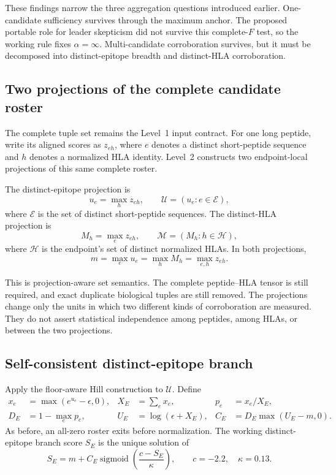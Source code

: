 \documentclass[11pt]{article}
\newcommand{\sigmoid}{\operatorname{sigmoid}}
\begin{document}
These findings narrow the three aggregation questions introduced earlier.
One-candidate sufficiency survives through the maximum anchor. The proposed
portable role for leader skepticism did not survive this complete-$F$ test,
so the working rule fixes $\alpha=\infty$. Multi-candidate corroboration
survives, but it must be decomposed into distinct-epitope breadth and
distinct-HLA corroboration.

\subsection{Two projections of the complete candidate roster}

The complete tuple set remains the Level~1 input contract. For one long
peptide, write its aligned scores as $z_{eh}$, where $e$ denotes a distinct
short-peptide sequence and $h$ denotes a normalized HLA identity. Level~2
constructs two endpoint-local projections of this same complete roster.

The distinct-epitope projection is
\begin{equation}
u_e=\max_h z_{eh},
\qquad
\mathcal U=(u_e:e\in\mathcal E),
\label{eq:posttest-epitope-projection}
\end{equation}
where $\mathcal E$ is the set of distinct short-peptide sequences. The
distinct-HLA projection is
\begin{equation}
M_h=\max_e z_{eh},
\qquad
\mathcal M=(M_h:h\in\mathcal H),
\label{eq:posttest-hla-projection}
\end{equation}
where $\mathcal H$ is the endpoint's set of distinct normalized HLAs. In both
projections,
\begin{equation}
m=\max_e u_e=\max_h M_h=\max_{e,h}z_{eh}.
\label{eq:posttest-common-anchor}
\end{equation}

This is projection-aware set semantics. The complete peptide--HLA tensor is
still required, and exact duplicate biological tuples are still removed.
The projections change only the units in which two different kinds of
corroboration are measured. They do not assert statistical independence among
peptides, among HLAs, or between the two projections.

\subsection{Self-consistent distinct-epitope branch}

Apply the floor-aware Hill construction to $\mathcal U$. Define
\begin{align}
x_e&=\max(e^{u_e}-\epsilon,0),
&X_E&=\sum_e x_e,
&p_e&=x_e/X_E,\\
D_E&=1-\max_e p_e,
&U_E&=\log(\epsilon+X_E),
&C_E&=D_E\max(U_E-m,0).
\end{align}
As before, an all-zero roster exits before normalization. The working
distinct-epitope branch score $S_E$ is the unique solution of
\begin{equation}
\boxed{
S_E=m+C_E\sigmoid\left(\frac{c-S_E}{\kappa}\right),
\qquad c=-2.2,\quad \kappa=0.13.
}
\label{eq:posttest-epitope-self-gate}
\end{equation}
\end{document}
